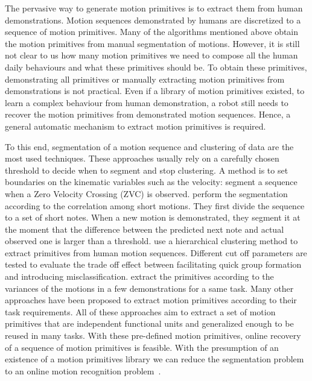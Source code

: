 The pervasive way to generate motion primitives is to extract them from human demonstrations. Motion sequences demonstrated by humans are discretized to a sequence of motion primitives.
Many of the algorithms mentioned above obtain the motion primitives from manual segmentation of motions. However, it is still not clear to us how many motion primitives we need to compose all the human daily behaviours and what these primitives should be. To obtain these primitives, demonstrating all primitives or manually extracting motion primitives from demonstrations is not practical. Even if a library of motion primitives existed, to learn a complex behaviour from human demonstration, a robot still needs to recover the motion primitives from demonstrated motion sequences. Hence, a general automatic mechanism to extract motion primitives is required.

To this end, segmentation of a motion sequence \citep{takano2006humanoid,Pais2013ID879} and clustering of data \citep{kulic2009online,kulic2012incremental} are the most used techniques. These approaches usually rely on a carefully chosen threshold to decide when to segment and stop clustering. A method is to set boundaries on the kinematic variables such as the velocity: \citet{fod2002automated} segment a sequence when a Zero Velocity Crossing (ZVC) is observed. \citet{takano2006humanoid} perform the segmentation according to the correlation among short motions. They first divide the sequence to a set of short notes. When a new motion is demonstrated, they segment it at the moment that the difference between the predicted next note and actual observed one is larger than a threshold. \citet{kulic2008incremental} use a hierarchical clustering method to extract primitives from human motion sequences. Different cut off parameters are tested to evaluate the trade off effect between facilitating quick group formation and introducing misclassification. \citet{Pais2013ID879} extract the primitives according to the variances of the motions in a few demonstrations for a same task. Many other approaches have been proposed to extract motion primitives according to their task requirements. All of these approaches aim to extract a set of motion primitives that are independent functional units and generalized enough to be reused in many tasks. With these pre-defined motion primitives, online recovery of a sequence of motion primitives is feasible. With the presumption of an existence of a motion primitives library we can reduce the segmentation problem to an online motion recognition problem~\citet{meier2011movement}.

